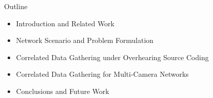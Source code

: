\begin{frame}{Outline}
\begin{itemize}
\item Introduction and Related Work
\item Network Scenario and Problem Formulation
\item Correlated Data Gathering under Overhearing Source Coding
\item Correlated Data Gathering for Multi-Camera Networks
\item Conclusions and Future Work
\end{itemize}
\end{frame}